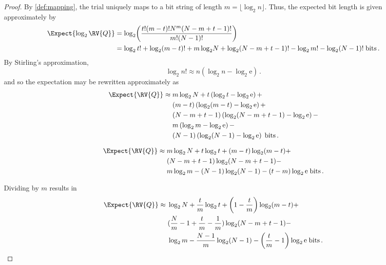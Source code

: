 \documentclass[ ../main.tex]{subfiles}
\begin{document}
\begin{proof}
	By \cref{def:mapping}, the \nth trial uniquely maps to a bit string of length $m = \lfloor \log_2 n \rfloor$. Thus, the expected bit length is given approximately by
	\begin{align}
	\Expect{\log_2 \RV{Q}}
	&= \log_2\!\left(\frac{t!(m-t)!N^m(N-m+t-1)!}{m!(N-1)!}\right)\\
	&= \log_2 t! + \log_2(m-t)! + m \log_2\! N +
	\log_2\!\left(N-m+t-1\right)! - \log_2 m! - \log_2(N-1)! \; \si{bits}\,.
	\end{align}
	By Stirling's approximation, 
	\begin{equation}
	\log_2 n! \approx n \left(\log_2 n - \log_2 \mathrm{e}\right)\,.
	\end{equation}
	and so the expectation may be rewritten approximately as
	\begin{equation}
	\begin{split}
	\Expect{\RV{Q}} \approx \;
	&m \log_2 N + t \left(\log_2 t - \log_2 \mathrm{e}\right) +\\
	&(m - t) \left(\log_2 (m - t) - \log_2 \mathrm{e}\right) +\\
	&(N - m + t - 1) \left(\log_2 (N - m + t - 1) - \log_2 \mathrm{e}\right) -\\
	&m \left(\log_2 m - \log_2 \mathrm{e}\right) -\\
	&(N-1) \left(\log_2 (N-1) - \log_2 \mathrm{e}\right) \; \si{bits}\,.
	\end{split}
	\end{equation}
	
	\begin{equation}
	\begin{split}
	\Expect{\RV{Q}} \approx \;
	&m \log_2 N + t \log_2 t  + (m - t) \log_2 (m - t) +\\
	&(N - m + t - 1) \log_2 (N - m + t - 1) -\\
	&m \log_2 m - (N-1) \log_2 (N-1) - (t - m) \log_2 \mathrm{e} \; \si{bits}\,.
	\end{split}
	\end{equation}
	
	Dividing by $m$ results in
	\begin{equation}
	\begin{split}
	\Expect{\RV{Q}} \approx \;
	&\log_2 N + \frac{t}{m} \log_2 t  + \left(1 - \frac{t}{m}\right) \log_2 (m - t) +\\
	&(\frac{N}{m} - 1 + \frac{t}{m} - \frac{1}{m}) \log_2 (N - m + t - 1) -\\
	&\log_2 m - \frac{N-1}{m} \log_2 (N-1) - \left(\frac{t}{m} - 1\right) \log_2 \mathrm{e} \; \si{bits}\,.
	\end{split}
	\end{equation}
	

\end{proof}
\end{document}
